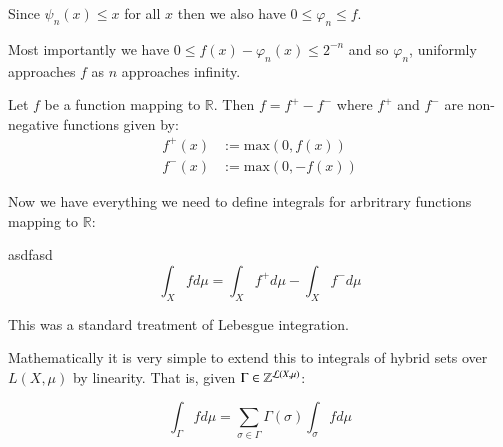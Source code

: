 Since $\psi_n(x) \leq x$ for all $x$ then we also have $0 \leq \varphi_n \leq f$.

Most importantly we have $0 \leq f(x) - \varphi_n(x) \leq 2^{-n}$ and so $\varphi_n$, uniformly approaches $f$ as $n$ approaches infinity. 

\begin{theorem}
Let $f$ be a function mapping to $\mathbb{R}$. Then $f = f^+ - f^-$ where $f^+$ and $f^-$ are non-negative functions given by:
\begin{align}
f^+(x) &:= \mathrm{max}( 0, f(x)) \\
f^-(x) &:= \mathrm{max}(0, -f(x)) 
\end{align}
\end{theorem}

Now we have everything we need to define integrals for arbritrary functions mapping to $\mathbb{R}$:

\begin{definition}
asdfasd
\begin{equation}
\int_X f d \mu = \int_X f^+ d \mu - \int_X f^- d \mu
\end{equation}
\end{definition}



This was a standard treatment of Lebesgue integration.

Mathematically it is very simple to extend this to integrals of hybrid sets over $L(X, \mu)$ by linearity.
That is, given $\Gamma \in \hsetover[\mathcal{L}(X,\mu)]$:

\begin{equation}
\int_\Gamma f d \mu = \sum_{\sigma \in \Gamma} \Gamma(\sigma) \int_\sigma f d\mu
\end{equation}



%
%

